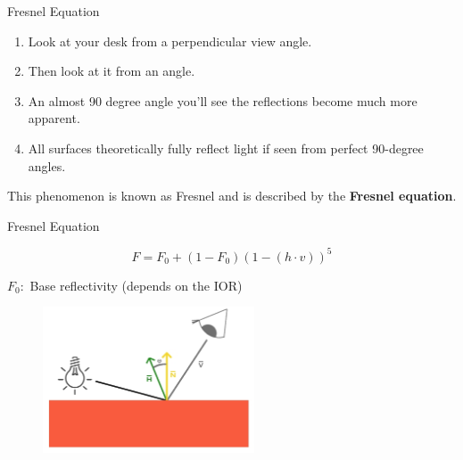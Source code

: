 \documentclass[]{beamer}
\begin{document}
\begin{frame}
  \textcolor{mypink1}{Fresnel Equation} 
  \vspace{7mm}

  \begin{enumerate}
    \item Look at your desk from a perpendicular view angle.\pause
    \item Then look at it from an angle.\pause
    \item An almost 90 degree angle you'll see the reflections become much more apparent. \pause
    \item All surfaces theoretically fully reflect light if seen from perfect 90-degree angles.\pause
  \end{enumerate}
  
  \vspace{7mm}

  
 This phenomenon is known as Fresnel and is described by the \textbf{Fresnel equation}.
\end{frame}





\begin{frame}
  \textcolor{mypink1}{Fresnel Equation} 
  \vspace{7mm}

\begin{equation*}
  F=F_0+(1-F_0)(1-(h\cdot v))^5
\end{equation*}
\pause
\vspace{10mm}

$F_0:$ Base reflectivity (depends on the IOR)
\pause
\vspace{5mm}

\begin{figure}[h!]
  \begin{center}
    \includegraphics[height=1.7in]{images/23.jpg}
  \end{center}
\end{figure}

\end{frame}

 
\end{document}

